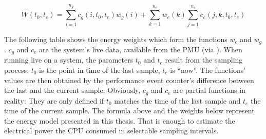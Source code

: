 \begin{equation}
W(t_0, t_e) = \sum\limits_{i=1}^{n_g} c_g(i, t_0, t_e) w_g(i) +
\sum\limits_{k=1}^{n_e} w_e(k) \sum\limits_{j=1}^{n_c}
c_e(j, k, t_0, t_e)
\end{equation}

The following table shows the energy weights which form the functions $w_c$ and
$w_g$. $c_g$ and $c_e$ are the system's live data, available from the PMU (via
\JWTlibpfm{}). When running live on a system, the parameters $t_0$ and $t_e$
result from the sampling process: $t_0$ is the point in time of the last sample,
$t_e$ is ``now''. The functions' values are then obtained by the performance
event counter's difference between the last and the current sample. Obviously,
$c_g$ and $c_e$ are partial functions in reality: They are only defined if $t_0$
matches the time of the last sample and $t_e$ the time of the current sample.
The formula above and the weights below represent the energy model presented in
this thesis. That is enough to estimate the electrical power the CPU consumed in
selectable sampling intervals.


